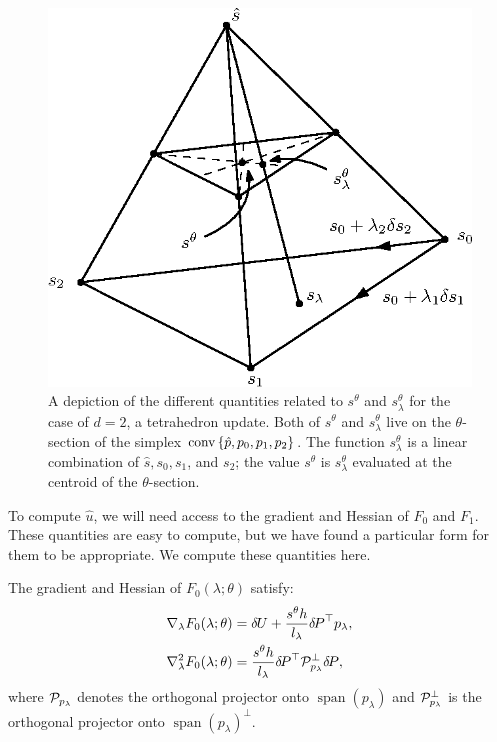 \documentclass[eikonal.tex]{subfiles}
\begin{document}
\begin{figure}
  \centering
  \includegraphics{slowness-tetra.eps}
  \caption{A depiction of the different quantities related to
    $s^{\theta}$ and $s^{\theta}_\lambda$ for the case of $d = 2$, a
    tetrahedron update. Both of $s^\theta$ and $s^\theta_\lambda$ live
    on the $\theta$-section of the simplex
    $\operatorname{conv} \left\{\hat{p}, p_0, p_1, p_2\right\}$. The function
    $s^\theta_\lambda$ is a linear combination of $\hat{s}, s_0, s_1$,
    and $s_2$; the value $s^\theta$ is $s^\theta_\lambda$ evaluated at
    the centroid of the $\theta$-section.}
\end{figure}

To compute $\hat{u}$, we will need access to the gradient and Hessian
of $F_0$ and $F_1$. These quantities are easy to compute, but we have
found a particular form for them to be appropriate. We compute these
quantities here.

\begin{lemma}\label{prop:F0-grad-and-Hess}
  The gradient and Hessian of $F_0(\lambda; \theta)$ satisfy:
  \begin{align}
    \nabla_\lambda F_0(\lambda; \theta) &= {\delta \hspace{-0.09em} U} + \frac{s^{\theta} h}{l_\lambda} {\delta \hspace{-0.14em} P}^\top p_\lambda, \\
    \nabla^2_\lambda F_0(\lambda; \theta) &= \frac{s^{\theta} h}{l_\lambda} {\delta \hspace{-0.14em} P}^\top \mathcal{P}^\perp_{p_\lambda} {\delta \hspace{-0.14em} P},
  \end{align}
  where $\mathcal{P}_{p_\lambda}$ denotes the orthogonal projector onto
  $\operatorname{span}(p_\lambda)$ and $\mathcal{P}_{p_\lambda}^\perp$ is
  the orthogonal projector onto
  $\operatorname{span}(p_\lambda)^\perp$.
\end{lemma}
\end{document}
